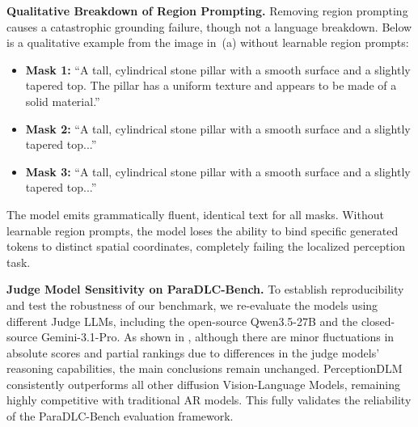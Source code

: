 \noindent
\textbf{Qualitative Breakdown of Region Prompting.}
Removing region prompting causes a catastrophic grounding failure, though not a language breakdown. Below is a qualitative example from the image in~(a) without learnable region prompts:
\begin{itemize}
    \item \textbf{Mask 1:} ``A tall, cylindrical stone pillar with a smooth surface and a slightly tapered top. The pillar has a uniform texture and appears to be made of a solid material.''
    \item \textbf{Mask 2:} ``A tall, cylindrical stone pillar with a smooth surface and a slightly tapered top...''
    \item \textbf{Mask 3:} ``A tall, cylindrical stone pillar with a smooth surface and a slightly tapered top...''
\end{itemize}
The model emits grammatically fluent, identical text for all masks. Without learnable region prompts, the model loses the ability to bind specific generated tokens to distinct spatial coordinates, completely failing the localized perception task.

\noindent
\textbf{Judge Model Sensitivity on ParaDLC-Bench.}
To establish reproducibility and test the robustness of our benchmark, we re-evaluate the models using different Judge LLMs, including the open-source Qwen3.5-27B and the closed-source Gemini-3.1-Pro. As shown in , although there are minor fluctuations in absolute scores and partial rankings due to differences in the judge models' reasoning capabilities, the main conclusions remain unchanged. PerceptionDLM consistently outperforms all other diffusion Vision-Language Models, remaining highly competitive with traditional AR models. This fully validates the reliability of the ParaDLC-Bench evaluation framework.

